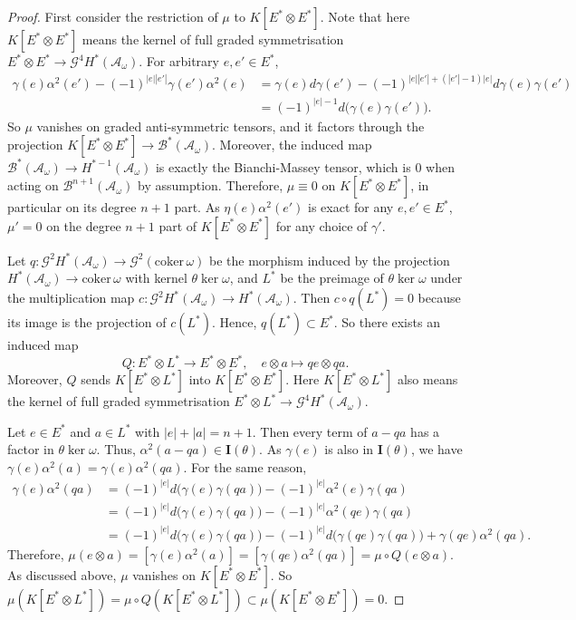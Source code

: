 \documentclass{article}
\theoremstyle{plain}
\theoremstyle{definition}
\theoremstyle{plain}
\numberwithin{equation}{section}
\begin{document}
\begin{proof}
First consider the restriction of $\mu$ to $K[E^*\otimes E^*]$. Note that here $K[E^*\otimes E^*]$ means the kernel of full graded symmetrisation $E^*\otimes E^*\to \mathcal{G}^4H^*(\mathcal{A}_{\omega})$. For arbitrary $e,e'\in E^*$,
\begin{align*}
\gamma(e)\alpha^2(e')-(-1)^{|e||e'|}\gamma(e')\alpha^2(e) &= \gamma(e)d\gamma(e')-(-1)^{|e||e'|+(|e'|-1)|e|}d\gamma(e)\gamma(e') \\
&= (-1)^{|e|-1}d\big(\gamma(e)\gamma(e')\big).
\end{align*}
So $\mu$ vanishes on graded anti-symmetric tensors, and it factors through the projection $K[E^*\otimes E^*]\to\mathcal{B}^*(\mathcal{A_{\omega}})$. Moreover, the induced map $\mathcal{B}^*(\mathcal{A_{\omega}})\to H^{*-1}(\mathcal{A}_{\omega})$ is exactly the Bianchi-Massey tensor, which is 0 when acting on $\mathcal{B}^{n+1}(\mathcal{A_{\omega}})$ by assumption. Therefore, $\mu\equiv 0$ on $K[E^*\otimes E^*]$, in particular on its degree $n+1$ part. As $\eta(e)\alpha^2(e')$ is exact for any $e,e'\in E^*$, $\mu'=0$ on the degree $n+1$ part of $K[E^*\otimes E^*]$ for any choice of $\gamma'$.

Let $q:\mathcal{G}^2H^*(\mathcal{A}_{\omega})\to \mathcal{G}^2(\text{coker}\,\omega)$ be the morphism induced by the projection $H^*(\mathcal{A}_{\omega})\to \text{coker}\,\omega$ with kernel $\theta\ker\omega$, and $L^*$ be the preimage of $\theta\ker\omega$ under the multiplication map $c:\mathcal{G}^2H^*(\mathcal{A}_{\omega})\to H^*(\mathcal{A}_{\omega})$. Then $c\circ q(L^*)=0$ because its image is the projection of $c(L^*)$. Hence, $q(L^*)\subset E^*$. So there exists an induced map
$$
Q: E^*\otimes L^*\to E^*\otimes E^*,\quad e\otimes a\mapsto qe\otimes qa.
$$
Moreover, $Q$ sends $K[E^*\otimes L^*]$ into $K[E^*\otimes E^*]$. Here $K[E^*\otimes L^*]$ also means the kernel of full graded symmetrisation $E^*\otimes L^*\to \mathcal{G}^4H^*(\mathcal{A}_{\omega})$.

Let $e\in E^*$ and $a\in L^*$ with $|e|+|a|=n+1$. Then every term of $a-qa$ has a factor in $\theta\ker\omega$. Thus, $\alpha^2(a-qa)\in\mathbf{I}(\theta)$. As $\gamma(e)$ is also in $\mathbf{I}(\theta)$, we have $\gamma(e)\alpha^2(a)=\gamma(e)\alpha^2(qa)$. For the same reason,
\begin{align*}
\gamma(e)\alpha^2(qa) &= (-1)^{|e|}d\big(\gamma(e)\gamma(qa)\big)-(-1)^{|e|}\alpha^2(e)\gamma(qa) \\
&= (-1)^{|e|}d\big(\gamma(e)\gamma(qa)\big)-(-1)^{|e|}\alpha^2(qe)\gamma(qa) \\
&= (-1)^{|e|}d\big(\gamma(e)\gamma(qa)\big)-(-1)^{|e|}d\big(\gamma(qe)\gamma(qa)\big)+\gamma(qe)\alpha^2(qa).
\end{align*}
Therefore, $\mu(e\otimes a)=[\gamma(e)\alpha^2(a)]=[\gamma(qe)\alpha^2(qa)]=\mu\circ Q(e\otimes a)$. As discussed above, $\mu$ vanishes on $K[E^*\otimes E^*]$. So $\mu(K[E^*\otimes L^*])=\mu\circ Q(K[E^*\otimes L^*])\subset\mu(K[E^*\otimes E^*])=0$.


\end{proof}
\end{document}
